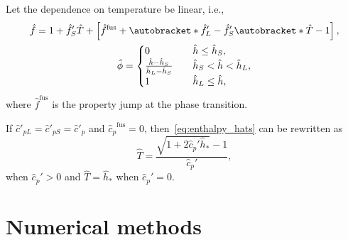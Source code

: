 \documentclass{article}
\DeclarePairedDelimiter\autobracket()       %
\newcommand{\br}[1]{\autobracket*{#1}}
\newcommand{\fusion}[1]{{#1}^\mathrm{fus}}
\begin{document}
Let the dependence on temperature be linear, i.e.,
\begin{gather}
	\hat{f} = 1 + \hat{f}'_S\hat{T} + \left[
	    \fusion{\hat{f}} + \br{ \hat{f}'_L - \hat{f}'_S }\br{ \hat{T}-1 }
	\right], \\
	\hat{\phi} = \begin{cases}
        0 & \quad \hat{h} \leq \hat{h}_S, \\
        \frac{\hat{h}-\hat{h}_S}{\hat{h}_L-\hat{h}_S} & \quad \hat{h}_S < \hat{h} < \hat{h}_L, \\
        1 & \quad \hat{h}_L \leq \hat{h},
    \end{cases}
\end{gather}
where \(\fusion{\hat{f}}\) is the property jump at the phase transition.

If \(\hat{c}'_{pL} = \hat{c}'_{pS} = \hat{c}'_p\) and \(\fusion{\hat{c}_{p}} = 0\),
then~\eqref{eq:enthalpy_hats} can be rewritten as
\begin{equation}\label{eq:temperature}
	\hat{T} = \frac{\sqrt{1+2\hat{c}_p'\hat{h}_*}-1}{\hat{c}_p'},
\end{equation}
when \(\hat{c}_p'>0\) and \(\hat{T} = \hat{h}_*\) when \(\hat{c}_p'=0\).

\section{Numerical methods}
\end{document}
